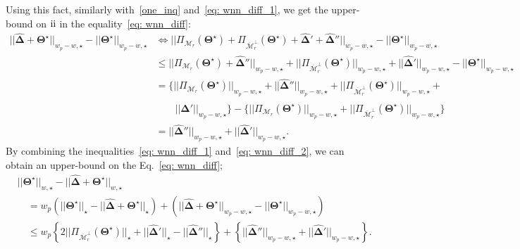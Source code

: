 \documentclass[alpha-refs]{wiley-article}
\newcommand{\RN}[1]{ \textup{\uppercase\expandafter{\romannumeral#1}} }
\begin{document}
Using this fact, similarly with~\eqref{one_inq} and~\eqref{eq: wnn_diff_1}, we get the upper-bound on $\RN{2}$ in the equality~\eqref{eq: wnn_diff}: 
\begin{align}
||\boldsymbol{\widehat{\Delta}} + \boldsymbol{\Theta^{\star}}||_{w_{p} - w, \star} -  ||\boldsymbol{\Theta^{\star}}||_{w_{p} - w, \star} 
 & \Leftrightarrow  ||\Pi_{\mathcal{M}_{r}}(\boldsymbol{\Theta^{\star}}) + \Pi_{\overline{\mathcal{M}}_{r}^{\perp}}(\boldsymbol{\Theta^{\star}}) + \boldsymbol{\widehat{\Delta}}' + \boldsymbol{\widehat{\Delta}}''||_{w_{p} - w, \star} - ||\boldsymbol{\Theta^{\star}}||_{w_{p} - w, \star} \nonumber\\
 & \leq ||\Pi_{\mathcal{M}_{r}}(\boldsymbol{\Theta^{\star}}) + \boldsymbol{\widehat{\Delta}}''||_{w_{p} - w, \star} + || \Pi_{\overline{\mathcal{M}}_{r}^{\perp}}(\boldsymbol{\Theta^{\star}}) ||_{w_{p} - w, \star} + ||\boldsymbol{\widehat{\Delta}}'||_{w_{p} - w, \star} - ||\boldsymbol{\Theta^{\star}}||_{w_{p} - w, \star} \nonumber\\
 & = \bigg\{ ||\Pi_{\mathcal{M}_{r}}(\boldsymbol{\Theta^{\star}})||_{w_{p} - w, \star} + || \boldsymbol{\widehat{\Delta}}''||_{w_{p} - w, \star}  + || \Pi_{\overline{\mathcal{M}}_{r}^{\perp}}(\boldsymbol{\Theta^{\star}}) ||_{w_{p} - w, \star} + \nonumber\\
 & \qquad ||\boldsymbol{\widehat{\Delta}}' ||_{w_{p} - w, \star} \bigg\}  - \bigg\{ ||\Pi_{\mathcal{M}_{r}}(\boldsymbol{\Theta^{\star}})||_{w_{p} - w, \star} + || \Pi_{\overline{\mathcal{M}}_{r}^{\perp}}(\boldsymbol{\Theta^{\star}}) ||_{w_{p} - w, \star} \bigg\} \nonumber\\
 & = ||\boldsymbol{\widehat{\Delta}}''||_{w_{p} - w, \star}  + ||\boldsymbol{\widehat{\Delta}}'||_{w_{p} - w, \star}. \label{eq: wnn_diff_2} 
\end{align}
By combining the inequalities~\eqref{eq: wnn_diff_1} and~\eqref{eq: wnn_diff_2}, we can obtain an upper-bound on the Eq.~\eqref{eq: wnn_diff};
\begin{align}
    &||\boldsymbol{\Theta^{\star}}||_{w,\star} - ||\boldsymbol{\widehat{\Delta}} + \boldsymbol{\Theta^{\star}}||_{w,\star} \nonumber \\
    &\quad =   w_{p}(||\boldsymbol{\Theta^{\star}}||_{\star} - ||\boldsymbol{\widehat{\Delta}} + \boldsymbol{\Theta^{\star}}||_{\star}) + (||\boldsymbol{\widehat{\Delta}} + \boldsymbol{\Theta^{\star}}||_{w_{p}-w,\star} - ||\boldsymbol{\Theta^{\star}}||_{w_{p}-w,\star} )  \nonumber\\ 
    &\quad \leq  w_{p}\left\lbrace 2||\Pi_{\overline{\mathcal{M}}_{r}^{\perp}}(\boldsymbol{\Theta^{\star}})||_{\star} + ||\boldsymbol{\widehat{\Delta}}'||_{\star} - ||\boldsymbol{\widehat{\Delta}}''||_{\star}  \right\rbrace + \left\lbrace ||\boldsymbol{\widehat{\Delta}}''||_{w_{p} - w, \star}  + ||\boldsymbol{\widehat{\Delta}}'||_{w_{p} - w, \star}\right\rbrace.\nonumber
\end{align}
\end{document}
